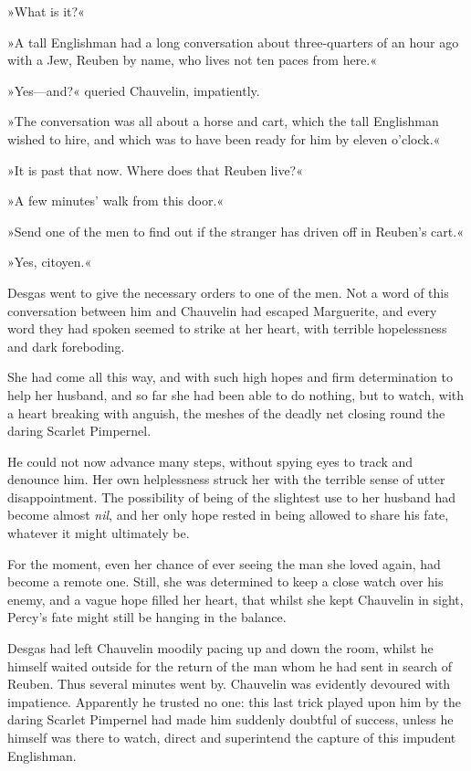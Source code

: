 »What is it?«

»A tall Englishman had a long conversation about three-quarters of an hour ago with a Jew, Reuben by name, who lives not ten paces from here.«

»Yes\allowbreak---\allowbreak and?« queried Chauvelin, impatiently.

»The conversation was all about a horse and cart, which the tall Englishman wished to hire, and which was to have been ready for him by eleven o'clock.«

»It is past that now. Where does that Reuben live?«

»A few minutes' walk from this door.«

»Send one of the men to find out if the stranger has driven off in Reuben's cart.«

»Yes, citoyen.«

Desgas went to give the necessary orders to one of the men. Not a word of this conversation between him and Chauvelin had escaped Marguerite, and every word they had spoken seemed to strike at her heart, with terrible hopelessness and dark foreboding.

She had come all this way, and with such high hopes and firm determination to help her husband, and so far she had been able to do nothing, but to watch, with a heart breaking with anguish, the meshes of the deadly net closing round the daring Scarlet Pimpernel.

He could not now advance many steps, without spying eyes to track and denounce him. Her own helplessness struck her with the terrible sense of utter disappointment. The possibility of being of the slightest use to her husband had become almost \textit{nil}, and her only hope rested in being allowed to share his fate, whatever it might ultimately be.

For the moment, even her chance of ever seeing the man she loved again, had become a remote one. Still, she was determined to keep a close watch over his enemy, and a vague hope filled her heart, that whilst she kept Chauvelin in sight, Percy's fate might still be hanging in the balance.

Desgas had left Chauvelin moodily pacing up and down the room, whilst he himself waited outside for the return of the man whom he had sent in search of Reuben. Thus several minutes went by. Chauvelin was evidently devoured with impatience. Apparently he trusted no one: this last trick played upon him by the daring Scarlet Pimpernel had made him suddenly doubtful of success, unless he himself was there to watch, direct and superintend the capture of this impudent Englishman.

